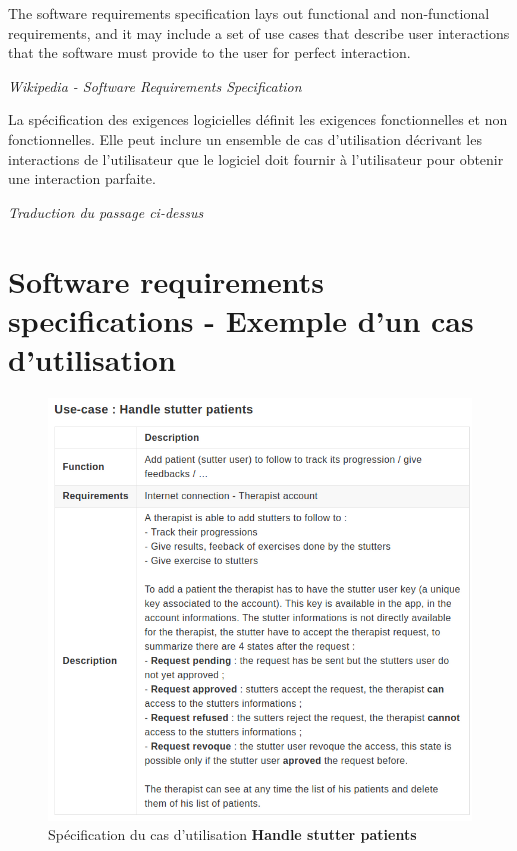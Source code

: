 \begin{appendices}
\begin{displayquote}
The software requirements specification lays out functional and non-functional requirements, and it may include a set of use cases that describe user interactions that the software must provide to the user for perfect interaction.
\end{displayquote}
\hspace*{\fill} \textit{Wikipedia - Software Requirements Specification}


\begin{displayquote}
La spécification des exigences logicielles définit les exigences fonctionnelles et non fonctionnelles. Elle peut inclure un ensemble de cas d'utilisation décrivant les interactions de l'utilisateur que le logiciel doit fournir à l'utilisateur pour obtenir une interaction parfaite.
\end{displayquote}
\hspace*{\fill} \textit{Traduction du passage ci-dessus}


\chapter{Software requirements specifications - Exemple d'un cas d'utilisation}
\label{appendix:srs_example}
\begin{figure}[h]
  \includegraphics[width=1\linewidth]{content/imgs/srs_use_case_ex.png}
  \caption*{Spécification du cas d'utilisation \textbf{Handle stutter patients}}
\end{figure}





\end{appendices}
